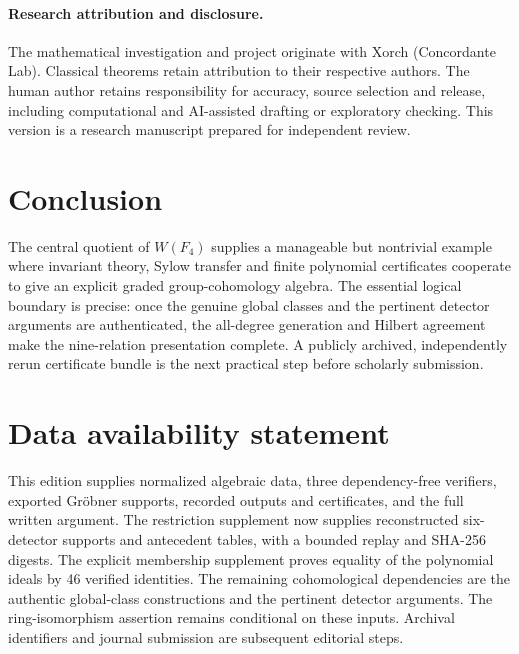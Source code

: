 \documentclass[11pt,a4paper]{article}
\theoremstyle{remark}\newtheorem{remark}[theorem]{Remark}
\begin{document}
\paragraph{Research attribution and disclosure.}
The mathematical investigation and project originate with Xorch (Concordante Lab). Classical theorems retain attribution to their respective authors. The human author retains responsibility for accuracy, source selection and release, including computational and AI-assisted drafting or exploratory checking. This version is a research manuscript prepared for independent review.

\section{Conclusion}
The central quotient of \(W(F_4)\) supplies a manageable but nontrivial example where invariant theory, Sylow transfer and finite polynomial certificates cooperate to give an explicit graded group-cohomology algebra. The essential logical boundary is precise: once the genuine global classes and the pertinent detector arguments are authenticated, the all-degree generation and Hilbert agreement make the nine-relation presentation complete. A publicly archived, independently rerun certificate bundle is the next practical step before scholarly submission.

\section*{Data availability statement}
This edition supplies normalized algebraic data, three dependency-free verifiers, exported Gr\"obner supports, recorded outputs and certificates, and the full written argument. The restriction supplement now supplies reconstructed six-detector supports and antecedent tables, with a bounded replay and SHA-256 digests. The explicit membership supplement proves equality of the polynomial ideals by 46 verified identities. The remaining cohomological dependencies are the authentic global-class constructions and the pertinent detector arguments. The ring-isomorphism assertion remains conditional on these inputs. Archival identifiers and journal submission are subsequent editorial steps.
\end{document}
